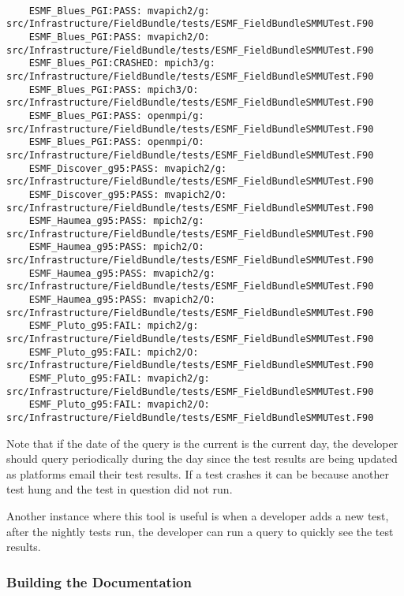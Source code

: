 \begin{verbatim}

	ESMF_Blues_PGI:PASS: mvapich2/g: src/Infrastructure/FieldBundle/tests/ESMF_FieldBundleSMMUTest.F90
	ESMF_Blues_PGI:PASS: mvapich2/O: src/Infrastructure/FieldBundle/tests/ESMF_FieldBundleSMMUTest.F90
	ESMF_Blues_PGI:CRASHED: mpich3/g: src/Infrastructure/FieldBundle/tests/ESMF_FieldBundleSMMUTest.F90
	ESMF_Blues_PGI:PASS: mpich3/O: src/Infrastructure/FieldBundle/tests/ESMF_FieldBundleSMMUTest.F90
	ESMF_Blues_PGI:PASS: openmpi/g: src/Infrastructure/FieldBundle/tests/ESMF_FieldBundleSMMUTest.F90
	ESMF_Blues_PGI:PASS: openmpi/O: src/Infrastructure/FieldBundle/tests/ESMF_FieldBundleSMMUTest.F90
	ESMF_Discover_g95:PASS: mvapich2/g: src/Infrastructure/FieldBundle/tests/ESMF_FieldBundleSMMUTest.F90
	ESMF_Discover_g95:PASS: mvapich2/O: src/Infrastructure/FieldBundle/tests/ESMF_FieldBundleSMMUTest.F90
	ESMF_Haumea_g95:PASS: mpich2/g: src/Infrastructure/FieldBundle/tests/ESMF_FieldBundleSMMUTest.F90
	ESMF_Haumea_g95:PASS: mpich2/O: src/Infrastructure/FieldBundle/tests/ESMF_FieldBundleSMMUTest.F90
	ESMF_Haumea_g95:PASS: mvapich2/g: src/Infrastructure/FieldBundle/tests/ESMF_FieldBundleSMMUTest.F90
	ESMF_Haumea_g95:PASS: mvapich2/O: src/Infrastructure/FieldBundle/tests/ESMF_FieldBundleSMMUTest.F90
	ESMF_Pluto_g95:FAIL: mpich2/g: src/Infrastructure/FieldBundle/tests/ESMF_FieldBundleSMMUTest.F90
	ESMF_Pluto_g95:FAIL: mpich2/O: src/Infrastructure/FieldBundle/tests/ESMF_FieldBundleSMMUTest.F90
	ESMF_Pluto_g95:FAIL: mvapich2/g: src/Infrastructure/FieldBundle/tests/ESMF_FieldBundleSMMUTest.F90
	ESMF_Pluto_g95:FAIL: mvapich2/O: src/Infrastructure/FieldBundle/tests/ESMF_FieldBundleSMMUTest.F90

\end{verbatim}

Note that if the date of the query is the current is the current day, the developer should query periodically during the day since
the test results are being updated as platforms email their test results.
If a test crashes it can be because another test hung and the test in question did not run.

Another instance where this tool is useful is when a developer adds a new test, after the nightly tests run, the developer can run a query to quickly see the test results.

\subsubsection{Building the Documentation}

